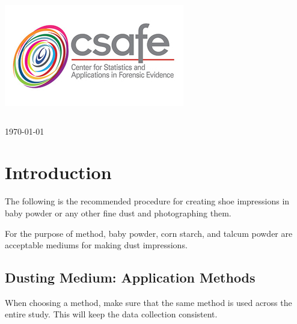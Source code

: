 \begin{titlepage}
\includegraphics[scale=.3]{Logo}\\[1cm]

\begin{center}
\begin{tabular}{ c   |   c }

\end{tabular}
\end{center}

{\large \today}\\[2cm] %


\vfill %


\end{titlepage}

\tableofcontents

\newpage

\vfill %





\section{Introduction}

The following is the recommended procedure for creating shoe impressions in baby powder or any other fine dust and photographing them.

For the purpose of method, baby powder, corn starch, and talcum powder are acceptable mediums for making dust impressions.

\subsection{Dusting Medium: Application Methods}
When choosing a method, make sure that the same method is used across the entire study. This will keep the data collection consistent.

